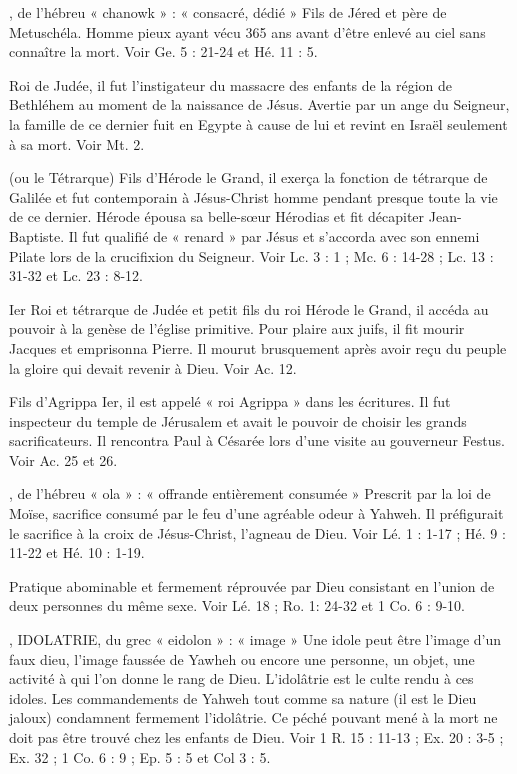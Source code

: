 \begin{multicols}{2}
, de l’hébreu « chanowk » : « consacré, dédié »
Fils de Jéred et père de Metuschéla. Homme pieux ayant vécu 365 ans avant d’être enlevé au ciel sans connaître la mort. Voir Ge. 5 : 21-24 et Hé. 11 : 5.


Roi de Judée, il fut l'instigateur du massacre des enfants de la région de Bethléhem au moment de la naissance de Jésus. Avertie par un ange du Seigneur, la famille de ce dernier fuit en Egypte à cause de lui et revint en Israël seulement à sa mort. Voir Mt. 2.


(ou le Tétrarque)
Fils d'Hérode le Grand, il exerça la fonction de tétrarque de Galilée et fut contemporain à Jésus-Christ homme pendant presque toute la vie de ce dernier. Hérode épousa sa belle-sœur Hérodias et fit décapiter Jean-Baptiste. Il fut qualifié de « renard » par Jésus et s’accorda avec son ennemi Pilate lors de la crucifixion du Seigneur. Voir Lc. 3 : 1 ; Mc. 6 : 14-28 ; Lc. 13 : 31-32 et Lc. 23 : 8-12.


Ier
Roi et tétrarque de Judée et petit fils du roi Hérode le Grand, il accéda au pouvoir à la genèse de l’église primitive. Pour plaire aux juifs, il fit mourir Jacques et emprisonna Pierre. Il mourut brusquement après avoir reçu du peuple la gloire qui devait revenir à Dieu. Voir Ac. 12.


Fils d’Agrippa Ier, il est appelé « roi Agrippa » dans les écritures. Il fut inspecteur du temple de Jérusalem et avait le pouvoir de choisir les grands sacrificateurs. Il rencontra Paul à Césarée lors d’une visite au gouverneur Festus. Voir Ac. 25 et 26.


, de l’hébreu « ola » : « offrande entièrement consumée »
Prescrit par la loi de Moïse, sacrifice consumé par le feu d'une agréable odeur à Yahweh. Il préfigurait le sacrifice à la croix de Jésus-Christ, l’agneau de Dieu. Voir Lé. 1 : 1-17 ; Hé. 9 : 11-22 et Hé. 10 : 1-19.


Pratique abominable et fermement réprouvée par Dieu consistant en l’union de deux personnes du même sexe. Voir Lé. 18 ; Ro. 1: 24-32 et 1 Co. 6 : 9-10.

, IDOLATRIE, du grec « eidolon » : « image »
Une idole peut être l’image d’un faux dieu, l’image faussée de Yawheh ou encore une personne, un objet, une activité à qui l’on donne le rang de Dieu. L’idolâtrie est le culte rendu à ces idoles.
Les commandements de Yahweh tout comme sa nature (il est le Dieu jaloux) condamnent fermement l’idolâtrie. Ce péché pouvant mené à la mort ne doit pas être trouvé chez les enfants de Dieu. Voir 1 R. 15 : 11-13 ; Ex. 20 : 3-5 ; Ex. 32 ; 1 Co. 6 : 9 ; Ep. 5 : 5 et Col 3 : 5.



\end{multicols}
